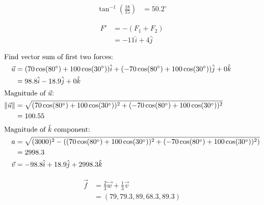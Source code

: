 \documentclass[10pt]{extarticle}
\title{}
\author{Avinash Iyer}
\date{}
\begin{document}
  \begin{problem}{13.2}
    \begin{description}[font=\normalfont]
      \item[10:]
        \begin{align*}
          \tan^{-1}\left(\frac{18}{15}\right) &= 50.2^{\circ}
        \end{align*}
      \item[16:]
        \begin{align*}
          F' &= -(F_1 + F_2)\\
             &= -11\hat{i} + 4\hat{j}
        \end{align*}
      \item[22:]
        \begin{align*}
          \shortintertext{Find vector sum of first two forces:}
          \vec{u} &= (70\cos(80\degree) + 100\cos(30\degree))\hat{i} + (-70\cos(80\degree) + 100\cos(30\degree))\hat{j} + 0\hat{k}\\
                  &= 98.8\hat{i} - 18.9\hat{j} + 0\hat{k}\\
          \shortintertext{Magnitude of $\vec{u}$:}
            \Vert\vec{u}\Vert &= \sqrt{(70\cos(80\degree) + 100\cos(30\degree))^2 + (-70\cos(80\degree) + 100\cos(30\degree))^2}\\
                              &= 100.55\\
                              \shortintertext{Magnitude of $\hat{k}$ component:}
            a &= \sqrt{(3000)^2 - \left((70\cos(80\degree) + 100\cos(30\degree))^2 + (-70\cos(80\degree) + 100\cos(30\degree))^2\right)}\\
              &= 2998.3\\
            \vec{v} &= -98.8\hat{i} + 18.9\hat{j} + 2998.3\hat{k}
        \end{align*}
      \item[24:]
        \begin{align*}
          \vec{f} &= \frac{2}{3}\vec{w} + \frac{1}{3}\vec{v}\\
                  &= (79,79.3,89,68.3,89.3)
        \end{align*}
    \end{description}
  \end{problem}
\end{document}

